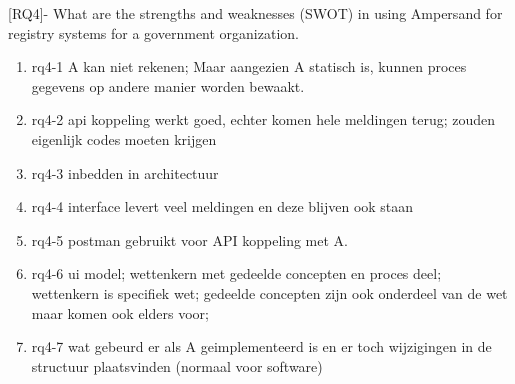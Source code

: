 [RQ4]- What are the strengths and weaknesses (SWOT) in using Ampersand for registry systems for a government organization.
\begin{enumerate}
    \item rq4-1 A kan niet rekenen; Maar aangezien A statisch is, kunnen proces gegevens op andere manier worden bewaakt.
    \item rq4-2 api koppeling werkt goed, echter komen hele meldingen terug; zouden eigenlijk codes moeten krijgen 
    \item rq4-3 inbedden in architectuur 
    \item rq4-4 interface levert veel meldingen en deze blijven ook staan
    \item rq4-5 postman gebruikt voor API koppeling met A. 
    \item rq4-6 ui model; wettenkern met gedeelde concepten en proces deel; wettenkern is specifiek wet; gedeelde concepten zijn ook onderdeel van de wet maar komen ook elders voor;
    \item rq4-7 wat gebeurd er als A geimplementeerd is en er toch wijzigingen in de structuur plaatsvinden (normaal voor software)
\end{enumerate}